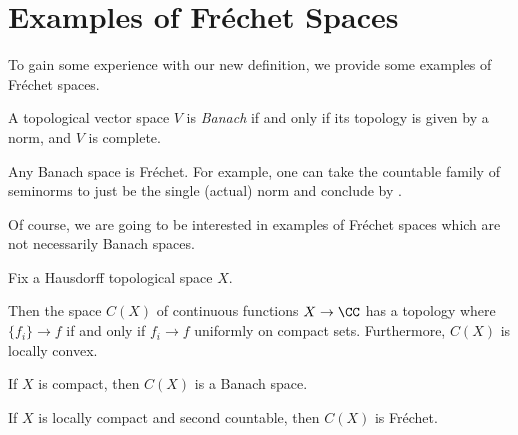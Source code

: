 \documentclass[notes.tex]{subfiles}
\begin{document}
\section{Examples of Fr\'echet Spaces}
To gain some experience with our new definition, we provide some examples of Fr\'echet spaces.
\begin{definition}[Banach]
	A topological vector space $V$ is \textit{Banach} if and only if its topology is given by a norm, and $V$ is complete.
\end{definition}
\begin{example}
	Any Banach space is Fr\'echet. For example, one can take the countable family of seminorms to just be the single (actual) norm and conclude by .
\end{example}
Of course, we are going to be interested in examples of Fr\'echet spaces which are not necessarily Banach spaces.
\begin{example} \label{ex:c-x-frechet}
	Fix a Hausdorff topological space $X$.
	\begin{listalph}
		\item Then the space $C(X)$ of continuous functions $X\to\CC$ has a topology where $\{f_i\}\to f$ if and only if $f_i\to f$ uniformly on compact sets. Furthermore, $C(X)$ is locally convex.
		\item If $X$ is compact, then $C(X)$ is a Banach space.
		\item If $X$ is locally compact and second countable, then $C(X)$ is Fr\'echet.
	\end{listalph}
\end{example}
\end{document}
